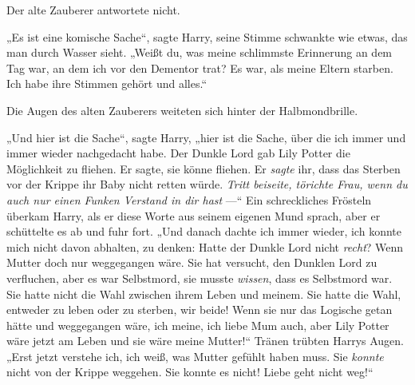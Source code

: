 Der alte Zauberer antwortete nicht.

„Es ist eine komische Sache“, sagte Harry, seine Stimme schwankte wie etwas, das man durch Wasser sieht.
„Weißt du, was meine schlimmste Erinnerung an dem Tag war, an dem ich vor den Dementor trat? Es war, als meine Eltern starben. Ich habe ihre Stimmen gehört und alles.“

Die Augen des alten Zauberers weiteten sich hinter der Halbmondbrille.

„Und hier ist die Sache“, sagte Harry, „hier ist die Sache, über die ich immer und immer wieder nachgedacht habe. Der Dunkle Lord gab Lily Potter die Möglichkeit zu fliehen. Er sagte, sie könne fliehen. Er \emph{sagte} ihr, dass das Sterben vor der Krippe ihr Baby nicht retten würde. \emph{Tritt beiseite, törichte Frau, wenn du auch nur einen Funken Verstand in dir hast} —“
Ein schreckliches Frösteln überkam Harry, als er diese Worte aus seinem eigenen Mund sprach, aber er schüttelte es ab und fuhr fort.
„Und danach dachte ich immer wieder, ich konnte mich nicht davon abhalten, zu denken: Hatte der Dunkle Lord nicht \emph{recht}? Wenn Mutter doch nur weggegangen wäre. Sie hat versucht, den Dunklen Lord zu verfluchen, aber es war Selbstmord, sie musste \emph{wissen}, dass es Selbstmord war. Sie hatte nicht die Wahl zwischen ihrem Leben und meinem. Sie hatte die Wahl, entweder zu leben oder zu sterben, wir beide! Wenn sie nur das Logische getan hätte und weggegangen wäre, ich meine, ich liebe Mum auch, aber Lily Potter wäre jetzt am Leben und sie wäre meine Mutter!“
Tränen trübten Harrys Augen.
„Erst jetzt verstehe ich, ich weiß, was Mutter gefühlt haben muss. Sie \emph{konnte} nicht von der Krippe weggehen. Sie konnte es nicht! Liebe geht nicht weg!“

